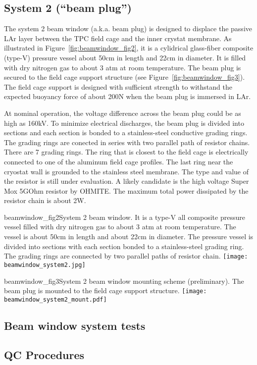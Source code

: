 \subsection{System 2 (``beam plug'')}
The system 2 beam window (a.k.a. beam plug) is designed to displace the passive LAr layer between the TPC field cage and the inner crystat membrane. As illustrated in Figure~\ref{fig:beamwindow_fig2}, it is a cylidrical glass-fiber composite (type-V) pressure vessel about 50cm in length and  22cm in diameter. It is filled with dry nitrogen gas to about 3 atm at room temperature. The beam plug is secured to the field cage support structure (see Figure~\ref{fig:beamwindow_fig3}). The field cage support is designed with sufficient strength to withstand the expected buoyancy force of about 200N when the beam plug is immersed in LAr. 

At nominal operation, the voltage difference across the beam plug could be as high as 160kV. To minimize electrical discharges, the beam plug is divided into sections and each section is bonded to a stainless-steel conductive grading rings. The grading rings are conected in series with two parallel path of resistor chains. There are 7 grading rings. The ring that is closest to the field cage is electrically connected to one of the aluminum field cage profiles. The last ring near the cryostat wall is grounded to the stainless steel membrane. The type and value of the resistor is still under evaluation. A likely candidate is the high voltage Super Mox 5GOhm resistor by OHMITE. The maximum total power dissipated by the resistor chain is about 2W.

\begin{cdrfigure}{beamwindow_fig2}{System 2 beam window. It is a type-V all composite pressure vessel filled with dry nitrogen gas to about 3 atm at room temperature. The vessel is about 50cm in length and about 22cm in diameter. The pressure vessel is divided into sections with each section bonded to a stainless-steel grading ring. The grading rings are connected by two parallel paths of resistor chain.}
  \texttt{[image: beamwindow\_system2.jpg]}
\end{cdrfigure}

\begin{cdrfigure}{beamwindow_fig3}{System 2 beam window mounting scheme (preliminary). The beam plug is mounted to the field cage support structure.}
  \texttt{[image: beamwindow\_system2\_mount.pdf]}
\end{cdrfigure}

\subsection{Beam window system tests}


\subsection{QC Procedures}


